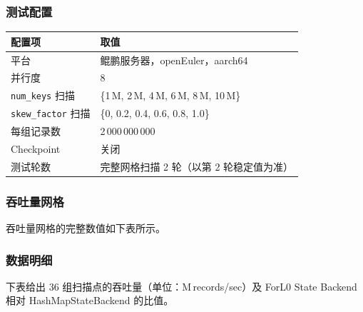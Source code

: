 \documentclass[a4paper,11pt]{article}
\newcommand{\project}{ForL0 State Backend}
\begin{document}
\subsubsection{测试配置}

\begin{table}[H]
\centering
\small
\begin{tabularx}{\textwidth}{L{3.4cm} X}
\toprule
\textbf{配置项} & \textbf{取值} \\
\midrule
平台                   & 鲲鹏服务器，openEuler，aarch64 \\
并行度                 & 8 \\
\texttt{num\_keys} 扫描 & \{1\,M, 2\,M, 4\,M, 6\,M, 8\,M, 10\,M\} \\
\texttt{skew\_factor} 扫描 & \{0, 0.2, 0.4, 0.6, 0.8, 1.0\} \\
每组记录数             & 2\,000\,000\,000 \\
Checkpoint             & 关闭 \\
测试轮数               & 完整网格扫描 2 轮（以第 2 轮稳定值为准） \\
\bottomrule
\end{tabularx}
\end{table}

\subsubsection{吞吐量网格}

吞吐量网格的完整数值如下表所示。

\subsubsection{数据明细}

下表给出 36 组扫描点的吞吐量（单位：M\,records/sec）及 \project{} 相对 HashMapStateBackend 的比值。
\end{document}

